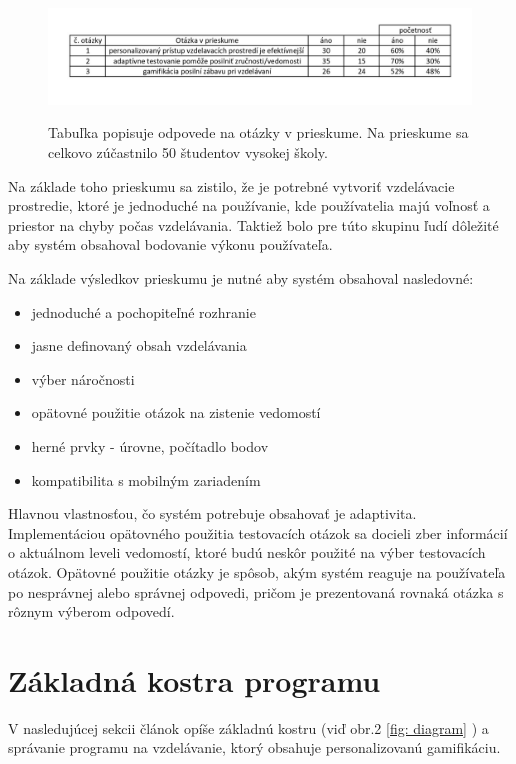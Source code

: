 \documentclass[10pt,twoside,slovak,a4paper]{article}
\begin{document}
\begin{figure}[h]
\includegraphics[scale=.75]{tabulka.jpg}
\label{fig: tabulka}
\caption{Tabuľka popisuje odpovede na otázky v prieskume. Na prieskume sa celkovo zúčastnilo 50 študentov vysokej školy.}
\end{figure}

Na základe toho prieskumu sa zistilo, že je potrebné vytvoriť vzdelávacie prostredie, ktoré je jednoduché na používanie, kde používatelia majú voľnosť a priestor na chyby počas vzdelávania. Taktiež bolo pre túto skupinu ľudí dôležité aby systém obsahoval bodovanie výkonu používateľa.

Na základe výsledkov prieskumu je nutné aby systém obsahoval nasledovné: 
\begin{itemize} \label{prvky}
\item jednoduché a pochopiteľné rozhranie
\item jasne definovaný obsah vzdelávania
\item výber náročnosti
\item opätovné použitie otázok na zistenie vedomostí
\item herné prvky \cite{duolingo} - úrovne, počítadlo bodov
\item kompatibilita s mobilným zariadením
\end{itemize}

Hlavnou vlastnosťou, čo systém potrebuje obsahovať je adaptivita. Implementáciou opätovného použitia testovacích otázok sa docieli zber informácií o aktuálnom leveli vedomostí, ktoré budú neskôr použité na výber testovacích otázok. Opätovné použitie otázky je spôsob, akým systém reaguje na používateľa po nesprávnej alebo správnej odpovedi, pričom je prezentovaná rovnaká otázka s rôznym výberom odpovedí.

\section{Základná kostra programu} \label{program}

V nasledujúcej sekcii článok opíše základnú kostru (viď obr.2 \ref{fig: diagram} ) a správanie programu na vzdelávanie, ktorý obsahuje personalizovanú gamifikáciu.
\end{document}
